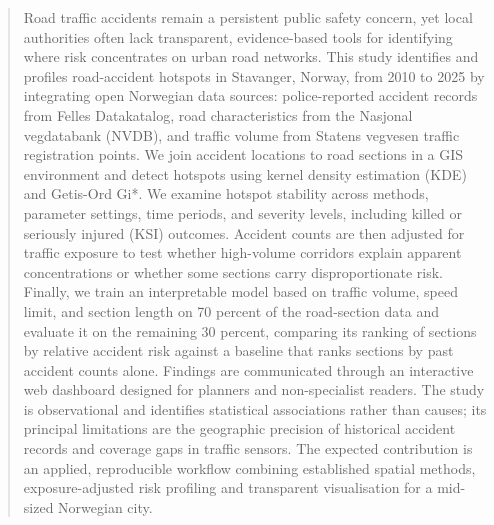 \begin{abstract}
Road traffic accidents remain a persistent public safety concern, yet local authorities often lack transparent, evidence-based tools for identifying where risk concentrates on urban road networks. This study identifies and profiles road-accident hotspots in Stavanger, Norway, from 2010 to 2025 by integrating open Norwegian data sources: police-reported accident records from Felles Datakatalog, road characteristics from the Nasjonal vegdatabank (NVDB), and traffic volume from Statens vegvesen traffic registration points. We join accident locations to road sections in a GIS environment and detect hotspots using kernel density estimation (KDE) and Getis-Ord Gi*. We examine hotspot stability across methods, parameter settings, time periods, and severity levels, including killed or seriously injured (KSI) outcomes. Accident counts are then adjusted for traffic exposure to test whether high-volume corridors explain apparent concentrations or whether some sections carry disproportionate risk. Finally, we train an interpretable model based on traffic volume, speed limit, and section length on 70 percent of the road-section data and evaluate it on the remaining 30 percent, comparing its ranking of sections by relative accident risk against a baseline that ranks sections by past accident counts alone. Findings are communicated through an interactive web dashboard designed for planners and non-specialist readers. The study is observational and identifies statistical associations rather than causes; its principal limitations are the geographic precision of historical accident records and coverage gaps in traffic sensors. The expected contribution is an applied, reproducible workflow combining established spatial methods, exposure-adjusted risk profiling and transparent visualisation for a mid-sized Norwegian city.
\end{abstract}